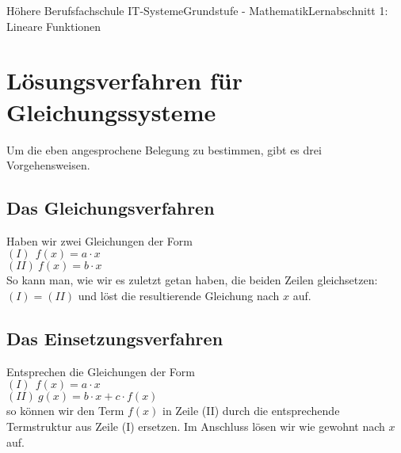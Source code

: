 \documentclass[11pt,twocolumn,oneside,openany,headings=optiontotoc,11pt,numbers=noenddot]{article}
\begin{document}
\begin{worksheet}{Höhere Berufsfachschule IT-Systeme}{Grundstufe - 
		Mathematik}{Lernabschnitt 1: Lineare Funktionen}
		\section*{Lösungsverfahren für Gleichungssysteme}
		Um die eben angesprochene Belegung zu bestimmen, gibt es drei Vorgehensweisen.
		\subsection{Das Gleichungsverfahren}
		Haben wir zwei Gleichungen der Form\\
		\((I)\ \ f(x) = a\cdot{}x\)\\
		\((II)\ f(x) = b\cdot{}x\)\\
		So kann man, wie wir es zuletzt getan haben, die beiden Zeilen gleichsetzen: \((I) = (II)\) und löst die resultierende Gleichung nach \(x\) auf.
		\subsection{Das Einsetzungsverfahren}
		Entsprechen die Gleichungen der Form\\
		\((I)\ \ f(x) = a\cdot{}x\)\\
		\((II)\ g(x) = b\cdot{}x + c\cdot{}f(x)\)\\
		so können wir den Term \(f(x)\) in Zeile (II) durch die entsprechende Termstruktur aus Zeile (I) ersetzen. Im Anschluss lösen wir wie gewohnt nach \(x\) auf.

\end{worksheet}
\end{document}
